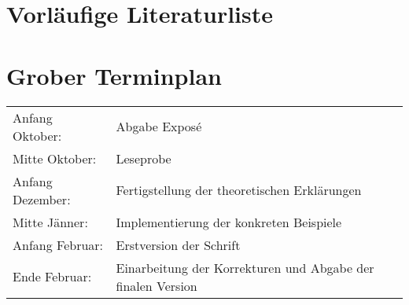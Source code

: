 \documentclass[a4paper, parindent, ngerman]{scrreprt}
\begin{document}
\chapter{Vorläufige Literaturliste}

\begingroup
\renewcommand{\cleardoublepage}{}
\renewcommand{\clearpage}{}
\nocite{*}
\printbibliography[heading=none]{}
\endgroup

\chapter{Grober Terminplan}
\begin{tabular}{ll}
Anfang Oktober: & Abgabe Exposé\\
Mitte Oktober: & Leseprobe\\
Anfang Dezember: & Fertigstellung der theoretischen Erklärungen\\
Mitte Jänner: & Implementierung der konkreten Beispiele\\
Anfang Februar: & Erstversion der Schrift\\
Ende Februar: & Einarbeitung der Korrekturen und Abgabe der finalen Version
\end{tabular}
\end{document}
